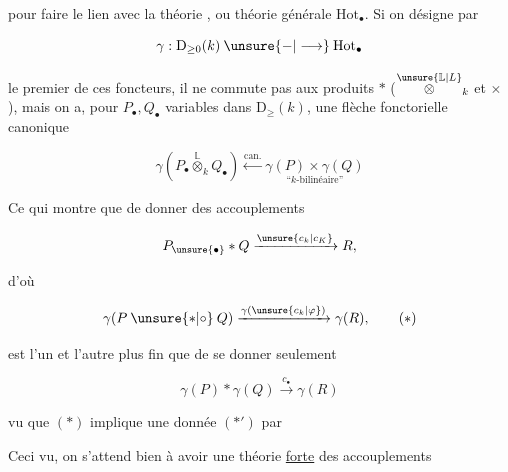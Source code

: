 

pour faire le lien avec la théorie , ou théorie générale  $\mathrm{Hot}_{\bullet}$. Si on désigne par

\[
 \gamma:\mathrm D_{\geq 0}(k)\mathbin{\unsure{-|\longrightarrow}}\mathrm{Hot}_{\bullet}
\]

le premier de ces foncteurs, il ne commute pas aux produits $*$ ($\overset{\unsure{\mathbb L|L}}{\otimes}_k$ et $\times$ ), mais on a, pour $P_\bullet,Q_\bullet$ variables dans $\mathrm D_{\geq}(k)$, une flèche fonctorielle canonique

\[
 \gamma(P_\bullet\overset{\mathbb L}{\otimes}_k Q_\bullet)
 \xleftarrow{\mathrm{can.}}\underset{\text{``$k$-bilinéaire''}}{\gamma(P)\times\gamma(Q)}
\]

Ce qui montre que de donner des accouplements

\[
 P_{\unsure{\bullet}}\mathbin{*}Q\xrightarrow{\unsure{c_k|c_K}}R,
\]

d'où

\[
 \gamma(P\mathbin{\unsure{*|\circ}}Q)\xrightarrow{\gamma(\unsure{c_k|\varphi})}\gamma(R),\tag*{$(*)$}
\]

est l'un et l'autre plus fin que de se donner seulement

\[
 \gamma(P)\mathbin{*}\gamma(Q)\xrightarrow{c_\bullet}\gamma(R)\tag*{$(*')$}
\]

vu que  $(*)$ implique une donnée $(*')$ par


Ceci vu, on s'attend bien à avoir une théorie \uline{forte} des accouplements

